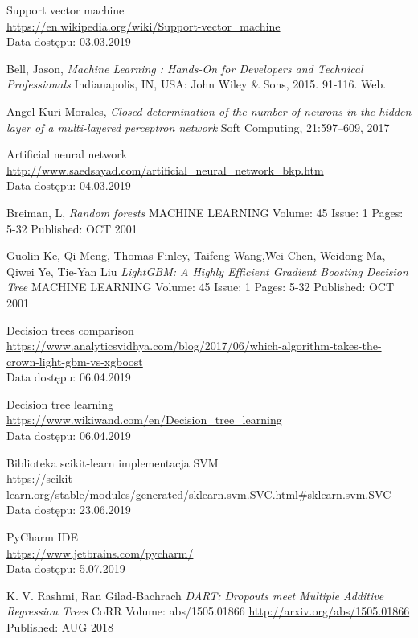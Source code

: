 \documentclass[a4paper, twoside, 11pt, openright]{article}
\begin{document}
\begin{thebibliography}{9}
	Support vector machine
	\\\url{https://en.wikipedia.org/wiki/Support-vector_machine} 
	\\Data dostępu: 03.03.2019

	Bell, Jason, \textit{Machine Learning : Hands-On for Developers and Technical Professionals}  Indianapolis, IN, USA: John Wiley \& Sons, 2015. 91-116. Web.


	Angel Kuri-Morales, 
  \textit{Closed determination of the number of neurons in the hidden layer of a multi-layered perceptron network}
  Soft Computing, 21:597–609, 2017

	Artificial neural network
	\\\url{http://www.saedsayad.com/artificial_neural_network_bkp.htm} 
	\\Data dostępu: 04.03.2019

	Breiman, L, 
  \textit{Random forests}
	MACHINE LEARNING  Volume: 45   Issue: 1   Pages: 5-32   Published: OCT 2001

Guolin Ke, Qi Meng, Thomas Finley, Taifeng Wang,Wei Chen, Weidong Ma, Qiwei Ye, Tie-Yan Liu
  \textit{LightGBM: A Highly Efficient Gradient Boosting Decision Tree}
	MACHINE LEARNING  Volume: 45   Issue: 1   Pages: 5-32   Published: OCT 2001



	Decision trees comparison
	\\\url{https://www.analyticsvidhya.com/blog/2017/06/which-algorithm-takes-the-crown-light-gbm-vs-xgboost} 
	\\Data dostępu: 06.04.2019


	Decision tree learning
	\\\url{https://www.wikiwand.com/en/Decision_tree_learning} 
	\\Data dostępu: 06.04.2019

	Biblioteka scikit-learn implementacja SVM
	\\\url{https://scikit-learn.org/stable/modules/generated/sklearn.svm.SVC.html#sklearn.svm.SVC}
	\\Data dostępu: 23.06.2019
	
	PyCharm IDE 
	\\\url{https://www.jetbrains.com/pycharm/}
	\\Data dostępu: 5.07.2019

	K. V. Rashmi, Ran Gilad-Bachrach
	\textit{DART: Dropouts meet Multiple Additive Regression Trees}
	CoRR Volume: abs/1505.01866 \url{http://arxiv.org/abs/1505.01866} Published: AUG 2018

\end{thebibliography}
\end{document}
